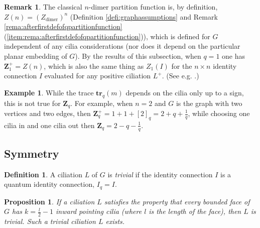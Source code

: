 \documentclass[12pt, reqno]{amsart}
\newtheorem{prop}[theo]{Proposition}
\theoremstyle{definition}
\newtheorem{defi}[theo]{Definition}
\newtheorem{rema}[theo]{Remark}
\newtheorem{exam}[theo]{Example}
\newcommand{\Zq}{\mathbf{Z}_q}%
\newcommand{\trq}{\mathbf{tr}_q}%
\begin{document}
\begin{rema}\label{rema:classicalndimerpartitionfunction}
The classical $n$-dimer partition function is, by definition, $Z(n)=(Z_\mathrm{dimer})^n$ (Definition \ref{defi:graphassumptions} and Remark \ref{rema:afterfirstdefofqpartitionfunction} (\ref{item:rema:afterfirstdefofqpartitionfunction})), which is defined for $G$ independent of any cilia considerations (nor does it depend on the particular planar embedding of $G$).  By the results of this subsection, when $q=1$ one has $\mathbf{Z}_1^+=Z(n)$, which is also the same thing as $Z_1(I)$ for the $n\times n$ identity connection $I$ evaluated for any positive ciliation $L^+$.  (See e.g. \cite{DKS}.)
\end{rema}

\begin{exam}
While the trace $\trq(m)$ depends on the cilia only up to a sign, this is not true for $\Zq$.    For example, when $n=2$ and $G$ is the graph with two vertices and two edges, then $\mathbf{Z}_q^+=1+1+[2]_q=2+q+\frac1q$,   while choosing one cilia in and one cilia out then $\mathbf{Z}_q=2-q-\frac1q$. 
\end{exam}

\subsection{Symmetry}

\begin{defi}\label{def:trivialciliation}
A ciliation $L$ of $G$ is \emph{trivial} if the identity connection $I$ is a quantum identity connection, $I_q=I$.
\end{defi}

\begin{prop}\label{id}
If a ciliation $L$ satisfies the property that every bounded face of $G$ has $k=\frac{l}{2}-1$ inward pointing cilia   (where $l$ is the length of the face), then $L$ is trivial. Such a trivial ciliation $L$ exists. 
\end{prop}
\end{document}
